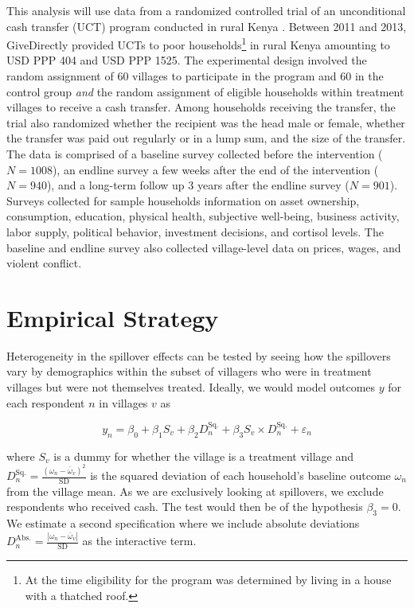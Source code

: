 \documentclass[11pt]{article}
\begin{document}
    This analysis will use data from a randomized controlled trial of an unconditional cash transfer (UCT) program conducted in rural Kenya \parencite{haushofer_short-term_2016}. Between 2011 and 2013, GiveDirectly provided UCTs to poor households\footnote{At the time eligibility for the program was determined by living in a house with a thatched roof.} in rural Kenya amounting to USD PPP 404 and USD PPP 1525. The experimental design involved the random assignment of 60 villages to participate in the program and 60 in the control group \textit{and} the random assignment of eligible households within treatment villages to receive a cash transfer. Among households receiving the transfer, the trial also randomized whether the recipient was the head male or female, whether the transfer was paid out regularly or in a lump sum, and the size of the transfer. The data is comprised of a baseline survey collected before the intervention ($N=1008$), an endline survey a few weeks after the end of the intervention ($N=940$), and a long-term follow up 3 years after the endline survey ($N=901$). Surveys collected for sample households information on asset ownership, consumption, education, physical health, subjective well-being, business activity, labor supply, political behavior, investment decisions, and cortisol levels. The baseline and endline survey also collected village-level data on prices, wages, and violent conflict.

\section{Empirical Strategy}

    Heterogeneity in the spillover effects can be tested by seeing how the spillovers vary by demographics within the subset of villagers who were in treatment villages but were not themselves treated. Ideally, we would model outcomes $y$ for each respondent $n$ in villages $v$ as
    
    \begin{equation*}
    y_n = \beta_0 + \beta_1 S_v + \beta_2 D^\text{Sq.}_n + \beta_3 S_v \times  D^\text{Sq.}_n + \varepsilon_n
    \end{equation*}
    
    where $S_v$ is a dummy for whether the village is a treatment village and $D^\text{Sq.}_n = \frac{(\omega_n - \bar{\omega}_v)^2}{\text{SD}}$ is the squared deviation of each household's baseline outcome $\omega_n$ from the village mean. As we are exclusively looking at spillovers, we exclude respondents who received cash. The test would then be of the hypothesis $\beta_3 = 0$. We estimate a second specification where we include absolute deviations $D^\text{Abs.}_n = \frac{|\omega_n - \bar{\omega}_v|}{\text{SD}}$ as the interactive term.
    
\end{document}
